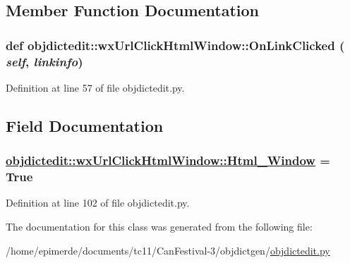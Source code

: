 \subsection{Member Function Documentation}
\hypertarget{classobjdictedit_1_1wxUrlClickHtmlWindow_7cd4af390c2de4ed45de931373d756f0}{
\subsubsection[OnLinkClicked]{\setlength{\rightskip}{0pt plus 5cm}def objdictedit::wx\-Url\-Click\-Html\-Window::On\-Link\-Clicked ( {\em self},  {\em linkinfo})}}
\label{classobjdictedit_1_1wxUrlClickHtmlWindow_7cd4af390c2de4ed45de931373d756f0}




Definition at line 57 of file objdictedit.py.

\subsection{Field Documentation}
\hypertarget{classobjdictedit_1_1wxUrlClickHtmlWindow_1de5f92921afa89cfe93fe8a6837dedb}{
\subsubsection[Html\_\-Window]{\setlength{\rightskip}{0pt plus 5cm}\hyperlink{classobjdictedit_1_1wxUrlClickHtmlWindow_1de5f92921afa89cfe93fe8a6837dedb}{objdictedit::wx\-Url\-Click\-Html\-Window::Html\_\-Window} = True}}
\label{classobjdictedit_1_1wxUrlClickHtmlWindow_1de5f92921afa89cfe93fe8a6837dedb}




Definition at line 102 of file objdictedit.py.

The documentation for this class was generated from the following file:\begin{CompactItemize}
\item 
/home/epimerde/documents/tc11/Can\-Festival-3/objdictgen/\hyperlink{objdictedit_8py}{objdictedit.py}\end{CompactItemize}
